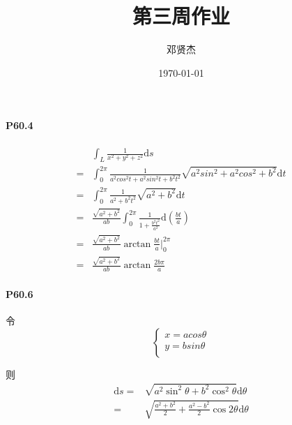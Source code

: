 \documentclass[UTF8]{ctexart}
\title{第三周作业}
\author{邓贤杰}
\date{\today}
\begin{document}
    \maketitle
    \paragraph*{P60.4}
    \begin{align*}
        &\int_{L}^{} \frac{1}{x^2+y^2+z^2} \mathrm{d}s \\
        =& \int_{0}^{2\pi} \frac{1}{a^2 cos^2t + a^2 sin^2t +b^2t^2} \sqrt{a^2sin^2+a^2cos^2+b^2} \mathrm{d}t \\
        =& \int_{0}^{2\pi} \frac{1}{a^2+b^2t^2} \sqrt{a^2+b^2} \mathrm{d}t \\ 
        =& \frac{\sqrt{a^2+b^2}}{ab} \int_{0}^{2\pi} \frac{1}{1+\frac{b^2t^2}{a^2} }\mathrm{d}\left(\frac{bt}{a}\right) \\
        =& \frac{\sqrt{a^2+b^2}}{ab} \arctan \frac{bt}{a} \big|_{0}^{2\pi} \\
        =& \frac{\sqrt{a^2+b^2}}{ab} \arctan \frac{2b\pi}{a}
    \end{align*}
    \paragraph*{P60.6}

    令
    \begin{equation}
     \begin{cases}
         x = acos\theta \\
        y = bsin\theta \\
     \end{cases}
    \end{equation}

    则
    \begin{align*}
        \mathrm{d}s =& \sqrt{a^2 \sin^2 \theta+b^2 \cos ^2 \theta} \mathrm{d}\theta \\
        =& \sqrt{\frac{a^2+b^2}{2} + \frac{a^2-b^2}{2} \cos 2\theta} \mathrm{d}\theta\\
    \end{align*}
\end{document}
